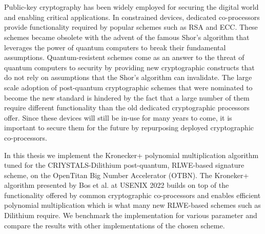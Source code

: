 \chapter{\abstractname}


Public-key cryptography has been widely employed for securing the digital world and enabling critical applications. In constrained devices, dedicated co-processors provide functionality required by popular schemes such as RSA and ECC. These schemes became obsolete with the advent of the famous Shor's algorithm that leverages the power of quantum computers to break their fundamental assumptions. Quantum-resistent schemes come as an answer to the threat of quantum computers to security by providing new cryptographic constructs that do not rely on assumptions that the Shor's algorithm can invalidate. The large scale adoption of post-quantum cryptographic schemes that were nominated to become the new standard is hindered by the fact that a large number of them require different functionality than the old dedicated cryptographic processors offer. Since these devices will still be in-use for many years to come, it is important to secure them for the future by repurposing deployed cryptographic co-processors.
 
In this thesis we implement the Kronecker+ polynomial multiplication algorithm tuned for the CRIYSTALS-Dilithium post-quantum, RLWE-based signature scheme, on the OpenTitan Big Number Accelerator (OTBN). The Kroneker+ algorithm presented by Bos et al. at USENIX 2022 builds on top of the functionality offered by common cryptographic co-processors and enables efficient polynomial multiplication which is what many new RLWE-based schemes such as Dilithium require. We benchmark the implementation for various parameter and compare the results with other implementations of the chosen scheme.